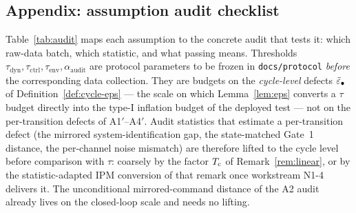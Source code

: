 \subsection{Appendix: assumption audit checklist}
\label{sec:audit}

Table~\ref{tab:audit} maps each assumption to the concrete audit that tests
it: which raw-data batch, which statistic, and what passing means. Thresholds
$\tau_{\mathrm{dyn}}, \tau_{\mathrm{ctrl}}, \tau_{\mathrm{env}},
\alpha_{\mathrm{audit}}$ are protocol parameters to be frozen in
\texttt{docs/protocol} \emph{before} the corresponding data collection. They
are budgets on the \emph{cycle-level} defects $\bar\varepsilon_{\mathrm{\bullet}}$ of
Definition~\ref{def:cycle-eps} --- the scale on which Lemma~\ref{lem:eps}
converts a $\tau$ budget directly into the type-I inflation budget of the
deployed test --- not on the per-transition defects of A1$'$--A4$'$. Audit
statistics that estimate a per-transition defect (the mirrored
system-identification gap, the state-matched Gate~1 distance, the
per-channel noise mismatch) are therefore lifted to the cycle level before
comparison with $\tau$: coarsely by the factor $T_{\mathrm{c}}$ of
Remark~\ref{rem:linear}, or by the statistic-adapted IPM conversion of that
remark once workstream N1-4 delivers it. The unconditional mirrored-command
distance of the A2 audit already lives on the closed-loop scale and needs no
lifting.

